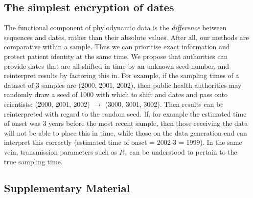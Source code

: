 \documentclass{article}
\begin{document}
\begin{spacing}{1.5}
\subsection*{The simplest encryption of dates}
The functional component of phylodynamic data is the \emph{difference} between sequences and dates, rather than their absolute values. After all, our methods are comparative within a sample. Thus we can prioritise exact information and protect patient identity at the same time. We propose that authorities can provide dates that are all shifted in time by an unknown seed number, and reinterpret results by factoring this in. For example, if the sampling times of a dataset of 3 samples are (2000, 2001, 2002), then public health authorities may randomly draw a seed of 1000 with which to shift and dates and pass onto scientists: (2000, 2001, 2002) $\rightarrow$ (3000, 3001, 3002). Then results can be reinterpreted with regard to the random seed. If, for example the estimated time of onset was 3 years before the most recent sample, then those receiving the data will not be able to place this in time, while those on the data generation end can interpret this correctly (estimated time of onset = 2002-3 = 1999). In the same vein, transmission parameters such as $R_e$ can be understood to pertain to the true sampling time.

\end{spacing}




\subsection*{Supplementary Material}

\renewcommand{\thefigure}{S\arabic{figure}}
\setcounter{figure}{0}
\end{document}
